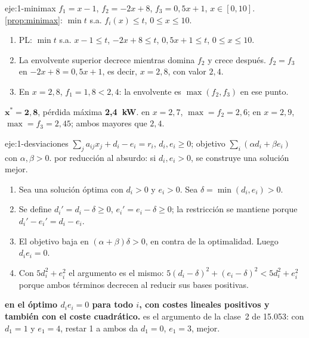 \begin{solucion}{eje:1-minimax}
\datos $f_1=x-1$, $f_2=-2x+8$, $f_3=0{,}5x+1$, $x\in[0,10]$.
\planteamiento \cref{prop:minimax}: $\min t$ s.a. $f_i(x)\le t$, $0\le x\le 10$.
\pasos
\begin{enumerate}[label=\arabic*.]
  \item PL: $\min t$ s.a. $x-1\le t$, $-2x+8\le t$, $0{,}5x+1\le t$, $0\le x\le 10$.
  \item La envolvente superior decrece mientras domina $f_2$ y crece después. $f_2=f_3$ en $-2x+8=0{,}5x+1$, es decir, $x=2{,}8$, con valor $2{,}4$.
  \item En $x=2{,}8$, $f_1=1{,}8<2{,}4$: la envolvente es $\max(f_2,f_3)$ en ese punto.
\end{enumerate}
\resultado $\bm{x^{*}=2{,}8}$, pérdida máxima \textbf{2,4~kW}.
\comprobacion en $x=2{,}7$, $\max=f_2=2{,}6$; en $x=2{,}9$, $\max=f_3=2{,}45$; ambos mayores que $2{,}4$.
\end{solucion}

\begin{solucion}{eje:1-desviaciones}
\datos $\sum_ja_{ij}x_j+d_i-e_i=r_i$, $d_i,e_i\ge 0$; objetivo $\sum_i(\alpha d_i+\beta e_i)$ con $\alpha,\beta>0$.
\planteamiento por reducción al absurdo: si $d_i,e_i>0$, se construye una solución mejor.
\pasos
\begin{enumerate}[label=\arabic*.]
  \item Sea una solución óptima con $d_i>0$ y $e_i>0$. Sea $\delta=\min(d_i,e_i)>0$.
  \item Se define $d_i'=d_i-\delta\ge 0$, $e_i'=e_i-\delta\ge 0$; la restricción se mantiene porque $d_i'-e_i'=d_i-e_i$.
  \item El objetivo baja en $(\alpha+\beta)\delta>0$, en contra de la optimalidad. Luego $d_ie_i=0$.
  \item Con $5d_i^{2}+e_i^{2}$ el argumento es el mismo: $5(d_i-\delta)^{2}+(e_i-\delta)^{2}<5d_i^{2}+e_i^{2}$ porque ambos términos decrecen al reducir sus bases positivas.
\end{enumerate}
\resultado \textbf{en el óptimo $d_ie_i=0$ para todo $i$, con costes lineales positivos y también con el coste cuadrático.}
\comprobacion es el argumento de la clase~2 de 15.053: con $d_1=1$ y $e_1=4$, restar 1 a ambos da $d_1=0$, $e_1=3$, mejor.
\end{solucion}

